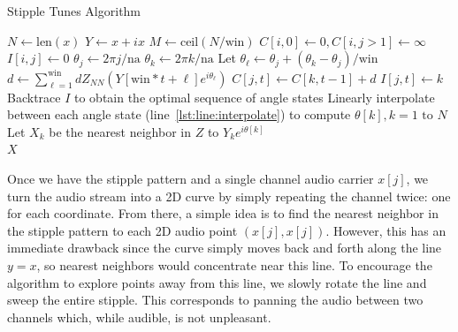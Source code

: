 \documentclass{article}
\begin{document}
\algrenewcommand\algorithmicindent{0.8em}%
\begin{algorithm}
  \caption{Stipple Tunes Algorithm}

  \begin{algorithmic}[1]
     
    \State $N \gets \text{len}(x)$ 
    \State $Y \gets x + ix$
    \State $M \gets \text{ceil}(N / \text{win})$
    \State $C[i, 0] \gets 0, C[i, j > 1] \gets \infty$ 
    \State $I[i, j] \gets 0$ 
            \State $\theta_j \gets 2 \pi j / \text{na}$
                \State $\theta_k \gets 2 \pi k / \text{na}$ \label{lst:line:interpolate}
                \State Let $\theta_{\ell} \gets \theta_j + (\theta_k-\theta_j)/\text{win}$ 
                \State $d \gets \sum_{\ell = 1}^{\text{win}} dZ_{NN}(Y[\text{win}*t + \ell] e^{i \theta_{\ell}})$ 
                    \State $C[j, t] \gets C[k, t-1] + d$ 
                    \State $I[j, t] \gets k$  
                \EndIf
            \EndFor
        \EndFor
    \EndFor \\
    \State Backtrace $I$ to obtain the optimal sequence of angle states
    \State Linearly interpolate between each angle state (line~\ref{lst:line:interpolate}) to compute $\theta[k], k = 1 \text{ to } N$ 
    \State Let $X_k$ be the nearest neighbor in $Z$ to $Y_k e^{i \theta[k]}$ \\
    \Return $X$
    \EndProcedure
  \end{algorithmic}
  \label{alg:stippletunes}
\end{algorithm}

Once we have the stipple pattern and a single channel audio carrier $x[j]$, we turn the audio stream into a 2D curve by simply repeating the channel twice: one for each coordinate.  From there, a simple idea is to find the nearest neighbor in the stipple pattern to each 2D audio point $(x[j], x[j])$.  However, this has an immediate drawback since the curve simply moves back and forth along the line $y=x$, so nearest neighbors would concentrate near this line.  To encourage the algorithm to explore points away from this line, we slowly rotate the line and sweep the entire stipple.  This corresponds to panning the audio between two channels which, while audible, is not unpleasant.
\end{document}
